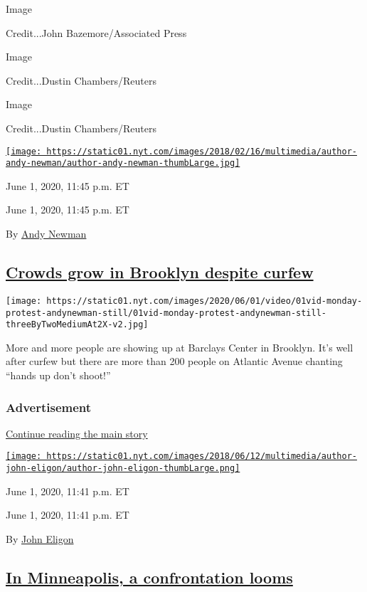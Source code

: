Image

Credit...John Bazemore/Associated Press

Image

Credit...Dustin Chambers/Reuters

Image

Credit...Dustin Chambers/Reuters

\href{https://www.nytimes.com/by/andy-newman}{\texttt{[image: https://static01.nyt.com/images/2018/02/16/multimedia/author-andy-newman/author-andy-newman-thumbLarge.jpg]}}

June 1, 2020, 11:45 p.m. ET

June 1, 2020, 11:45 p.m. ET

By \href{https://www.nytimes.com/by/andy-newman}{Andy Newman}

\hypertarget{crowds-grow-in-brooklyn-despite-curfew}{%
\subsection{\texorpdfstring{\protect\hyperlink{crowds-grow-in-brooklyn-despite-curfew}{Crowds
grow in Brooklyn despite
curfew}}{Crowds grow in Brooklyn despite curfew}}\label{crowds-grow-in-brooklyn-despite-curfew}}

\texttt{[image: https://static01.nyt.com/images/2020/06/01/video/01vid-monday-protest-andynewman-still/01vid-monday-protest-andynewman-still-threeByTwoMediumAt2X-v2.jpg]}

More and more people are showing up at Barclays Center in Brooklyn. It's
well after curfew but there are more than 200 people on Atlantic Avenue
chanting ``hands up don't shoot!''

\hypertarget{advertisement-2}{%
\subsubsection{Advertisement}\label{advertisement-2}}

\protect\hyperlink{after-dfp-ad-mid3}{Continue reading the main story}

\href{https://www.nytimes.com/by/john-eligon}{\texttt{[image: https://static01.nyt.com/images/2018/06/12/multimedia/author-john-eligon/author-john-eligon-thumbLarge.png]}}

June 1, 2020, 11:41 p.m. ET

June 1, 2020, 11:41 p.m. ET

By \href{https://www.nytimes.com/by/john-eligon}{John Eligon}

\hypertarget{in-minneapolis-a-confrontation-looms}{%
\subsection{\texorpdfstring{\protect\hyperlink{in-minneapolis-a-confrontation-looms}{In
Minneapolis, a confrontation
looms}}{In Minneapolis, a confrontation looms}}\label{in-minneapolis-a-confrontation-looms}}

